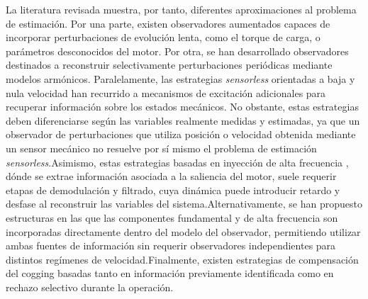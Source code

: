 La literatura revisada muestra, por tanto, diferentes aproximaciones al problema de estimación. Por una parte, existen observadores aumentados capaces de incorporar perturbaciones de evolución lenta, como el torque de carga, o parámetros desconocidos del motor. Por otra, se han desarrollado observadores destinados a reconstruir selectivamente perturbaciones periódicas mediante modelos armónicos. Paralelamente, las estrategias \textit{sensorless} orientadas a baja y nula velocidad han recurrido a mecanismos de excitación adicionales para recuperar información sobre los estados mecánicos. No obstante, estas estrategias deben diferenciarse según las variables realmente medidas y estimadas, ya que un observador de perturbaciones que utiliza posición o velocidad obtenida mediante un sensor mecánico no resuelve por sí mismo el problema de estimación \textit{sensorless}.Asimismo, estas estrategias basadas en inyección de alta frecuencia , dónde se extrae información asociada a la saliencia del motor, suele requerir etapas de demodulación y filtrado, cuya dinámica puede introducir retardo y desfase al reconstruir las variables del sistema.Alternativamente, se han propuesto estructuras en las que las componentes fundamental y de alta frecuencia son incorporadas directamente dentro del modelo del observador, permitiendo utilizar ambas fuentes de información sin requerir observadores independientes para distintos regímenes de velocidad.Finalmente, existen estrategias de compensación del cogging basadas tanto en información previamente identificada como en rechazo selectivo durante la operación.


%
%
%
%


